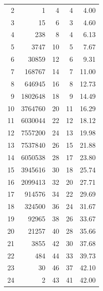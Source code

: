 \begin{figure}[tb]
\begin{center}
\begin{tabular}{rrrrr}
          2 &       1 &     4 &     4  &  4.00 \\
          3 &      15 &     6 &     3  &  4.60 \\
          4 &     238 &     8 &     4  &  6.13 \\
          5 &    3747 &    10 &     5  &  7.67 \\
          6 &   30859 &    12 &     6  &  9.31 \\
          7 &  168767 &    14 &     7  & 11.00 \\
          8 &  646945 &    16 &     8  & 12.73 \\
          9 & 1802648 &    18 &     9  & 14.49 \\
         10 & 3764760 &    20 &     11 & 16.29 \\
         11 & 6030044 &    22 &     12 & 18.12 \\
         12 & 7557200 &    24 &     13 & 19.98 \\
         13 & 7537840 &    26 &     15 & 21.88 \\
         14 & 6050538 &    28 &     17 & 23.80 \\
         15 & 3945616 &    30 &     18 & 25.74 \\
         16 & 2099413 &    32 &     20 & 27.71 \\
         17 &  914576 &    34 &     22 & 29.69 \\
         18 &  324500 &    36 &     24 & 31.67 \\
         19 &   92965 &    38 &     26 & 33.67 \\
         20 &   21257 &    40 &     28 & 35.66 \\
         21 &    3855 &    42 &     30 & 37.68 \\
         22 &     484 &    44 &     33 & 39.73 \\
         23 &      30 &    46 &     37 & 42.10 \\
         24 &       2 &    43 &     41 & 42.00 \\ \hline
    \end{tabular}
\end{center}
\end{figure}
